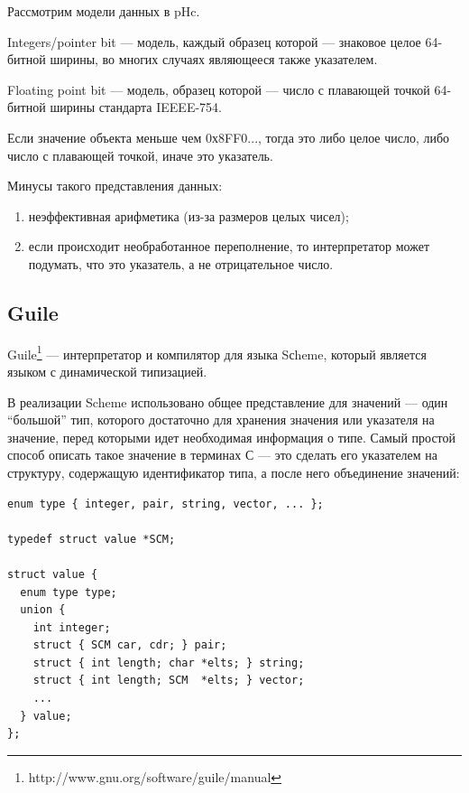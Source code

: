 Рассмотрим модели данных в pHc.

Integers/pointer bit --- модель, каждый образец которой --- знаковое целое 64-битной ширины, 
во многих случаях являющееся также указателем.

Floating point bit --- модель, образец которой --- число с плавающей точкой 64-битной ширины стандарта IEEEE-754.

Если значение объекта меньше чем 0х8FF0..., тогда это либо целое число, либо число с плавающей точкой,
иначе это указатель.

Минусы такого представления данных: 
\begin{enumerate}
\item неэффективная арифметика (из-за размеров целых чисел);
\item если происходит необработанное переполнение, то интерпретатор может 
подумать, что это указатель, а не отрицательное число.
\end{enumerate}

\subsection {Guile}

Guile\footnote{http://www.gnu.org/software/guile/manual} --- интерпретатор и компилятор для языка Sсheme, который
является языком с динамической типизацией.



В реализации Scheme использовано общее представление для значений ---
один ``большой'' тип, которого достаточно для хранения значения или указателя на значение,
перед которыми идет необходимая информация о типе. Самый простой способ описать такое значение в терминах С --- 
это сделать его указателем на структуру, содержащую идентификатор типа, а после него объединение 
значений:

\begin{lstlisting}
enum type { integer, pair, string, vector, ... };
  
typedef struct value *SCM;
  
struct value {
  enum type type;
  union {
    int integer;
    struct { SCM car, cdr; } pair;
    struct { int length; char *elts; } string;
    struct { int length; SCM  *elts; } vector;
    ...
  } value;
};
\end{lstlisting}

